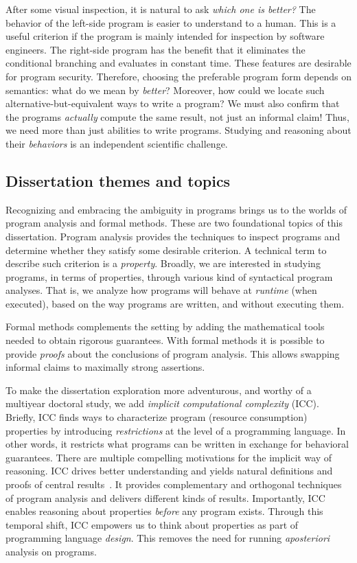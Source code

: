 After some visual inspection, it is natural to ask \emph{which one is better?}
The behavior of the left-side program is {easier} to understand {to a human}.
This is a useful criterion if the program is mainly intended for inspection by software engineers.
The right-side program has the benefit that it eliminates the conditional branching and evaluates in {constant time}.
These features are desirable for program security.
Therefore, choosing the preferable program form depends on semantics: what do we mean by \emph{better}?
Moreover, how could we locate such alternative-but-equivalent ways to write a program?
We must also confirm that the programs \emph{actually} compute the same result, not just an informal claim!
Thus, we need more than just abilities to write programs.
Studying and reasoning about their \emph{behaviors} is an independent scientific challenge.

\subsection{Dissertation themes and topics}
\label{subsec:dissertation-themes}

Recognizing and embracing the ambiguity in programs brings us to the worlds of program analysis and formal methods.
These are two foundational topics of this dissertation.
Program analysis provides the techniques to inspect programs and determine whether they satisfy some desirable criterion.
A technical term to describe such criterion is a \emph{property}.
Broadly, we are interested in studying programs, in terms of properties, through various kind of syntactical program analyses.
That is, we analyze how programs will behave at \emph{runtime} (when executed), based on the way programs are written, and without executing them.

Formal methods complements the setting by adding the mathematical tools needed to obtain rigorous guarantees.
With formal methods it is possible to provide \emph{proofs} about the conclusions of program analysis.
This allows swapping informal claims to maximally strong assertions.

To make the dissertation exploration more adventurous, and worthy of a multiyear doctoral study, we add \emph{implicit computational complexity} (ICC).
Briefly, ICC finds ways to characterize program (resource consumption) properties by introducing \emph{restrictions} at the level of a programming language.
In other words, it restricts what programs can be written in exchange for behavioral guarantees.
There are multiple compelling motivations for the implicit way of reasoning.
ICC drives better understanding and yields natural definitions and proofs of central results~\cite{kristiansen2017}.
It provides complementary and orthogonal techniques of program analysis and delivers different kinds of results.
Importantly, ICC enables reasoning about properties \emph{before} any program exists.
Through this temporal shift, ICC empowers us to think about properties as part of programming language \emph{design}.
This removes the need for running \emph{aposteriori} analysis on programs.

